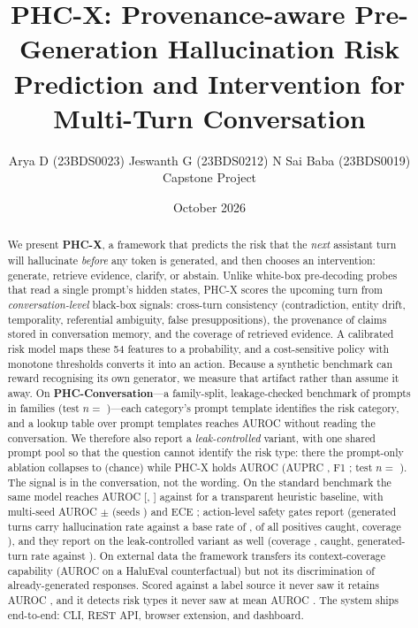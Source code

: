 \documentclass[10pt]{article}
\title{\textbf{PHC-X}: Provenance-aware Pre-Generation Hallucination Risk
Prediction and Intervention for Multi-Turn Conversation}
\author{Arya D (23BDS0023) \quad Jeswanth G (23BDS0212) \quad
N Sai Baba (23BDS0019)\\
Capstone Project}
\date{October 2026}
\begin{document}
\maketitle

\begin{abstract}
We present \textbf{PHC-X}, a framework that predicts the risk that the
\emph{next} assistant turn will hallucinate \emph{before} any token is
generated, and then chooses an intervention: generate, retrieve evidence,
clarify, or abstain. Unlike white-box pre-decoding probes that read a single
prompt's hidden states, PHC-X scores the upcoming turn from
\emph{conversation-level} black-box signals: cross-turn consistency
(contradiction, entity drift, temporality, referential ambiguity, false
presuppositions), the provenance of claims stored in conversation memory,
and the coverage of retrieved evidence. A calibrated risk model maps these
54 features to a probability, and a cost-sensitive policy with monotone
thresholds converts it into an action. Because a synthetic benchmark can
reward recognising its own generator, we measure that artifact rather than
assume it away. On \textbf{PHC-Conversation}---a family-split,
leakage-checked benchmark of \nrows{} prompts in \nfamilies{} families (test
$n=$ \ntest)---each category's prompt template identifies the risk category,
and a lookup table over prompt templates reaches AUROC \lookupauroc{} without
reading the conversation. We therefore also report a \emph{leak-controlled}
variant, with one shared prompt pool so that the question cannot identify
the risk type: there the prompt-only ablation collapses to \lcprompt{}
(chance) while PHC-X holds AUROC \lcauc{} (AUPRC \lcauprc, F1 \lcfone; test
$n=$ \lcntest). The signal is in the conversation, not the wording. On the
standard benchmark the same model reaches AUROC \auroc{} [\auroclo, \aurochi]
against \hauroc{} for a transparent heuristic baseline, with multi-seed
AUROC \msmean{}$\pm$\msstd{} (seeds \msses) and ECE \ece; action-level
safety gates report \gatestatus{} (generated turns carry hallucination rate
\riskgenerated{} against a base rate of \riskoverall, \caught{} of all
positives caught, coverage \coverage), and they report \lccoverageok{} on the
leak-controlled variant as well (coverage \lccoverage, \lccaugt{} caught,
generated-turn rate \lcriskgenerated{} against \lcriskoverall). On external
data the framework transfers its context-coverage capability (AUROC
\cfauroc{} on a HaluEval counterfactual) but not its discrimination of
already-generated responses. Scored against a label source it never saw it
retains AUROC \crossgold{}, and it detects risk types it never saw at mean
AUROC \locomean. The system ships end-to-end: CLI, REST API, browser
extension, and dashboard.
\end{abstract}
\end{document}
